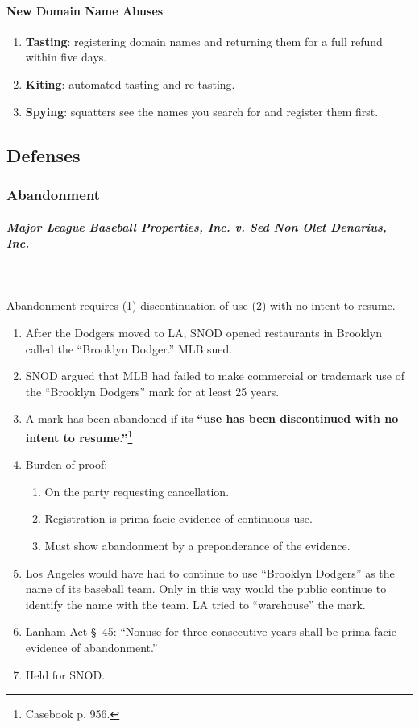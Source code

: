 \paragraph{New Domain Name Abuses}

\begin{enumerate}
    \item \textbf{Tasting}: registering domain names and returning them for a 
    full refund within five days.
    \item \textbf{Kiting}: automated tasting and re-tasting.
    \item \textbf{Spying}: squatters see the names you search for and register 
    them first.
\end{enumerate}

\subsection{Defenses}

\subsubsection{Abandonment}

\paragraph{\emph{Major League Baseball Properties, Inc. v. Sed Non Olet 
Denarius, Inc.}}
~\\\\
Abandonment requires (1) discontinuation of use (2) with no intent to resume.

\begin{enumerate}
    \item After the Dodgers moved to LA, SNOD opened restaurants in Brooklyn 
    called the ``Brooklyn Dodger.'' MLB sued.
    \item SNOD argued that MLB had failed to make commercial or trademark 
    use of the ``Brooklyn Dodgers'' mark for at least 25 years.
    \item A mark has been abandoned if its \textbf{``use has been discontinued 
    with no intent to resume.''}\footnote{Casebook p. 956.}
    \item Burden of proof:
    \begin{enumerate}
        \item On the party requesting cancellation.
        \item Registration is prima facie evidence of continuous use.
        \item Must show abandonment by a preponderance of the evidence.
    \end{enumerate}
    \item Los Angeles would have had to continue to use ``Brooklyn Dodgers''
    as the name of its baseball team. Only in this way would the public 
    continue to identify the name with the team. LA tried to ``warehouse'' the 
    mark.
    \item Lanham Act \S\ 45: ``Nonuse for three consecutive years shall be 
    prima facie evidence of abandonment.''
    \item Held for SNOD.
\end{enumerate}

